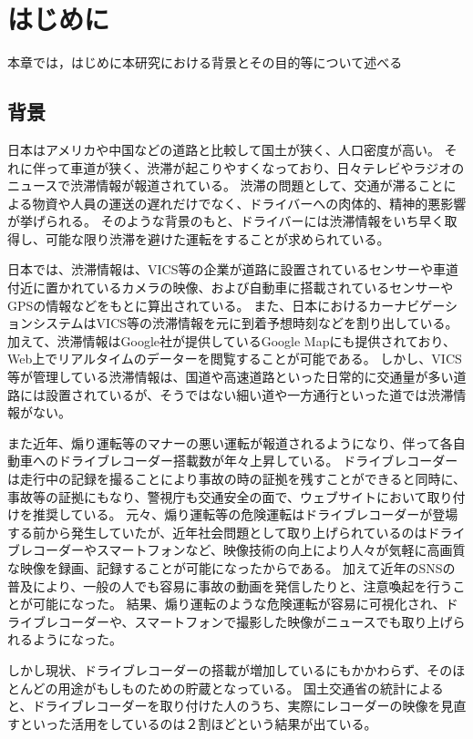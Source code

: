 \chapter{はじめに}
本章では，はじめに本研究における背景とその目的等について述べる
\section{背景}
日本はアメリカや中国などの道路と比較して国土が狭く、人口密度が高い。
それに伴って車道が狭く、渋滞が起こりやすくなっており、日々テレビやラジオのニュースで渋滞情報が報道されている。
渋滞の問題として、交通が滞ることによる物資や人員の運送の遅れだけでなく、ドライバーへの肉体的、精神的悪影響が挙げられる。
そのような背景のもと、ドライバーには渋滞情報をいち早く取得し、可能な限り渋滞を避けた運転をすることが求められている。


日本では、渋滞情報は、VICS等の企業が道路に設置されているセンサーや車道付近に置かれているカメラの映像、および自動車に搭載されているセンサーやGPSの情報などをもとに算出されている。
また、日本におけるカーナビゲーションシステムはVICS等の渋滞情報を元に到着予想時刻などを割り出している。
加えて、渋滞情報はGoogle社が提供しているGoogle Mapにも提供されており、Web上でリアルタイムのデーターを閲覧することが可能である。
しかし、VICS等が管理している渋滞情報は、国道や高速道路といった日常的に交通量が多い道路には設置されているが、そうではない細い道や一方通行といった道では渋滞情報がない。

また近年、煽り運転等のマナーの悪い運転が報道されるようになり、伴って各自動車へのドライブレコーダー搭載数が年々上昇している。
ドライブレコーダーは走行中の記録を撮ることにより事故の時の証拠を残すことができると同時に、事故等の証拠にもなり、警視庁も交通安全の面で、ウェブサイトにおいて取り付けを推奨している。
元々、煽り運転等の危険運転はドライブレコーダーが登場する前から発生していたが、近年社会問題として取り上げられているのはドライブレコーダーやスマートフォンなど、映像技術の向上により人々が気軽に高画質な映像を録画、記録することが可能になったからである。
加えて近年のSNSの普及により、一般の人でも容易に事故の動画を発信したりと、注意喚起を行うことが可能になった。
結果、煽り運転のような危険運転が容易に可視化され、ドライブレコーダーや、スマートフォンで撮影した映像がニュースでも取り上げられるようになった。

しかし現状、ドライブレコーダーの搭載が増加しているにもかかわらず、そのほとんどの用途がもしものための貯蔵となっている。
国土交通省の統計によると、ドライブレコーダーを取り付けた人のうち、実際にレコーダーの映像を見直すといった活用をしているのは２割ほどという結果が出ている\cite{ministryofland}。

